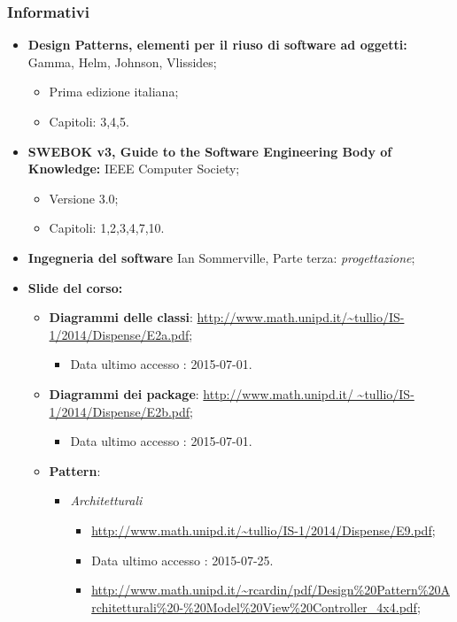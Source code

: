\subsubsection{Informativi}
	\begin{itemize}
		\item \textbf{Design Patterns, elementi per il riuso di software ad oggetti:} Gamma, Helm, Johnson, Vlissides;
		\begin{itemize}
			\item Prima edizione italiana;
			\item Capitoli: 3,4,5.			
		\end{itemize}
		
		\item \textbf{SWEBOK v3, Guide to the Software Engineering Body of Knowledge:} IEEE Computer Society;
		\begin{itemize}
			\item Versione 3.0;
			\item Capitoli: 1,2,3,4,7,10.			
		\end{itemize}
		\item \textbf{Ingegneria del software} Ian Sommerville, Parte terza: \textit{progettazione};
		\item \textbf{Slide del corso:}
				\begin{itemize}
					\item \textbf{Diagrammi delle classi}: \url{http://www.math.unipd.it/~tullio/IS-1/2014/Dispense/E2a.pdf};
					\begin{itemize}
						\item Data ultimo accesso : 2015-07-01.						
					\end{itemize}
					\item \textbf{Diagrammi dei package}: \url{http://www.math.unipd.it/ ~tullio/IS-1/2014/Dispense/E2b.pdf};
					\begin{itemize}
						\item Data ultimo accesso : 2015-07-01.						
					\end{itemize}
					\item \textbf{Pattern}:
					\begin{itemize}
						\item \textit{Architetturali}
							\begin{itemize}
								\item \url{http://www.math.unipd.it/~tullio/IS-1/2014/Dispense/E9.pdf};
									\item Data ultimo accesso : 2015-07-25.						
								\item \url{http://www.math.unipd.it/~rcardin/pdf/Design\%20Pattern\%20Architetturali\%20-\%20Model\%20View\%20Controller\_4x4.pdf};

\end{itemize}
\end{itemize}
\end{itemize}
\end{itemize}
